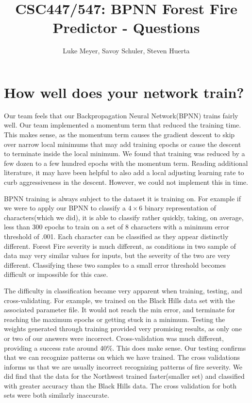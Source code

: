 \documentclass[10pt,a4paper,twocolumn,notitlepage]{article}
\author{Luke Meyer, Savoy Schuler, Steven Huerta}
\title{CSC447/547: BPNN Forest Fire Predictor - Questions}
\begin{document}
\maketitle

\section*{How well does your network train?}
Our team feels that our Backpropagation Neural Network(BPNN) trains fairly well. Our team implemented a momentum term that reduced the training time. This makes sense, as the momentum term causes the gradient descent to skip over narrow local minimums that may add training epochs or cause the descent to terminate inside the local minimum. We found that training was reduced by a few dozen to a few hundred epochs with the momentum term. Reading additional literature, it may have been helpful to also add a local adjusting learning rate to curb aggressiveness in the descent. However, we could not implement this in time.\par
BPNN training is always subject to the dataset it is training on. For example if we were to apply our BPNN to classify a $4\times 6$ binary representation of characters(which we did), it is able to classify rather quickly, taking, on average, less than 300 epochs to train on a set of 8 characters with a minimum error threshold of .001. Each character can be classified as they appear distinctly different. Forest Fire severity is much different, as conditions in two sample of data may very similar values for inputs, but the severity of the two are very different. Classifying these two samples to a small error threshold becomes difficult or impossible for this case.\par
The difficulty in classification became very apparent when training, testing, and cross-validating. For example, we trained on the Black Hills data set with the associated parameter file. It would not reach the min error, and terminate for reaching the maximum epochs or getting stuck in a minimum. Testing the weights generated through training provided very promising results, as only one or two of our answers were incorrect. Cross-validation was much different, providing a success rate around 40\%. This does make sense. Our testing confirms that we can recognize patterns on which we have trained. The cross validations informs us that we are usually incorrect recognizing patterns of fire severity. We did find that the data for the Northwest trained faster(smaller set) and classified with greater accuracy than the Black Hills data. The cross validation for both sets were both similarly inaccurate.\par
\end{document}
